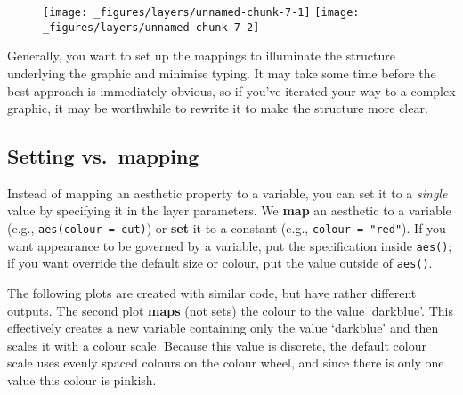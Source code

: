 \begin{figure}[H]
  \texttt{[image: \_figures/layers/unnamed-chunk-7-1]}%
  \texttt{[image: \_figures/layers/unnamed-chunk-7-2]}
\end{figure}

Generally, you want to set up the mappings to illuminate the structure
underlying the graphic and minimise typing. It may take some time before
the best approach is immediately obvious, so if you've iterated your way
to a complex graphic, it may be worthwhile to rewrite it to make the
structure more clear.

\hypertarget{sub:setting-mapping}{\subsection{Setting
vs.~mapping}\label{sub:setting-mapping}}

Instead of mapping an aesthetic property to a variable, you can set it
to a \emph{single} value by specifying it in the layer parameters. We
\textbf{map} an aesthetic to a variable (e.g.,
\texttt{aes(colour\ =\ cut)}) or \textbf{set} it to a constant (e.g.,
\texttt{colour\ =\ "red"}). If you want appearance to be governed by a
variable, put the specification inside \texttt{aes()}; if you want
override the default size or colour, put the value outside of
\texttt{aes()}. 

The following plots are created with similar code, but have rather
different outputs. The second plot \textbf{maps} (not sets) the colour
to the value `darkblue'. This effectively creates a new variable
containing only the value `darkblue' and then scales it with a colour
scale. Because this value is discrete, the default colour scale uses
evenly spaced colours on the colour wheel, and since there is only one
value this colour is pinkish.

\begin{Shaded}
\begin{Highlighting}[]
\StringTok{ }
\StringTok{  }\NormalTok{(} \NormalTok{) }

\StringTok{ }
\StringTok{  }\NormalTok{(}\NormalTok{(} \NormalTok{))}
\end{Highlighting}
\end{Shaded}

